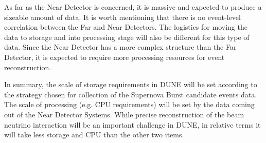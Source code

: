 As far as the Near Detector is concerned, it is massive and expected to produce a sizeable amount of data. It is worth mentioning
that there is no event-level correlation between the Far and Near Detectors. The logistics for moving the data to storage and into processing stage
will also be different for this type of data. Since the Near Detector has a more complex structure than the Far Detector, it is
expected to require more processing resources for event reconstruction.

In summary, the scale of storage requirements in DUNE will be set according to the strategy chosen for
collection of the Supernova Burst candidate events data. The scale of processing (e.g. CPU requirements)
will be set by the data coming out of the Near Detector Systems. While precise reconstruction of the
beam neutrino interaction will be an important challenge in DUNE, in relative terms it will take less storage
and CPU than the other two items.


